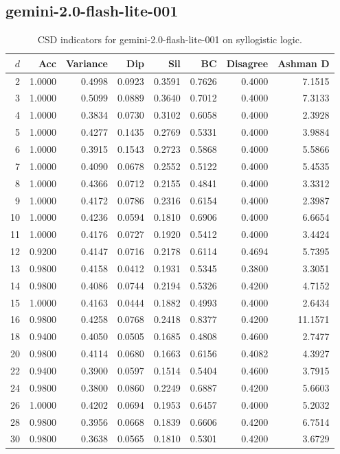 \documentclass[11pt]{article}
\begin{document}
\subsection{gemini-2.0-flash-lite-001}

\begin{table}[h]\centering\scriptsize
\caption{CSD indicators for gemini-2.0-flash-lite-001 on syllogistic logic.}
\begin{tabular}{r|r|r|r|r|r|r|r}
\toprule
$d$ & Acc & Variance & Dip & Sil & BC & Disagree & Ashman D \\
\midrule
2 & 1.0000 & 0.4998 & 0.0923 & 0.3591 & 0.7626 & 0.4000 & 7.1515 \\
3 & 1.0000 & 0.5099 & 0.0889 & 0.3640 & 0.7012 & 0.4000 & 7.3133 \\
4 & 1.0000 & 0.3834 & 0.0730 & 0.3102 & 0.6058 & 0.4000 & 2.3928 \\
5 & 1.0000 & 0.4277 & 0.1435 & 0.2769 & 0.5331 & 0.4000 & 3.9884 \\
6 & 1.0000 & 0.3915 & 0.1543 & 0.2723 & 0.5868 & 0.4000 & 5.5866 \\
7 & 1.0000 & 0.4090 & 0.0678 & 0.2552 & 0.5122 & 0.4000 & 5.4535 \\
8 & 1.0000 & 0.4366 & 0.0712 & 0.2155 & 0.4841 & 0.4000 & 3.3312 \\
9 & 1.0000 & 0.4172 & 0.0786 & 0.2316 & 0.6154 & 0.4000 & 2.3987 \\
10 & 1.0000 & 0.4236 & 0.0594 & 0.1810 & 0.6906 & 0.4000 & 6.6654 \\
11 & 1.0000 & 0.4176 & 0.0727 & 0.1920 & 0.5412 & 0.4000 & 3.4424 \\
12 & 0.9200 & 0.4147 & 0.0716 & 0.2178 & 0.6114 & 0.4694 & 5.7395 \\
13 & 0.9800 & 0.4158 & 0.0412 & 0.1931 & 0.5345 & 0.3800 & 3.3051 \\
14 & 0.9800 & 0.4086 & 0.0744 & 0.2194 & 0.5326 & 0.4200 & 4.7152 \\
15 & 1.0000 & 0.4163 & 0.0444 & 0.1882 & 0.4993 & 0.4000 & 2.6434 \\
16 & 0.9800 & 0.4258 & 0.0768 & 0.2418 & 0.8377 & 0.4200 & 11.1571 \\
18 & 0.9400 & 0.4050 & 0.0505 & 0.1685 & 0.4808 & 0.4600 & 2.7477 \\
20 & 0.9800 & 0.4114 & 0.0680 & 0.1663 & 0.6156 & 0.4082 & 4.3927 \\
22 & 0.9400 & 0.3900 & 0.0597 & 0.1514 & 0.5404 & 0.4600 & 3.7915 \\
24 & 0.9800 & 0.3800 & 0.0860 & 0.2249 & 0.6887 & 0.4200 & 5.6603 \\
26 & 1.0000 & 0.4202 & 0.0694 & 0.1953 & 0.6457 & 0.4000 & 5.2032 \\
28 & 0.9800 & 0.3956 & 0.0668 & 0.1839 & 0.6606 & 0.4200 & 6.7514 \\
30 & 0.9800 & 0.3638 & 0.0565 & 0.1810 & 0.5301 & 0.4200 & 3.6729 \\
\bottomrule
\end{tabular}
\end{table}
\end{document}
